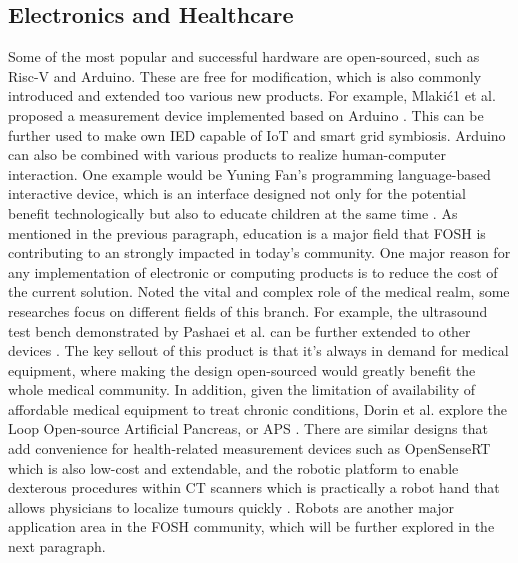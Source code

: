 \documentclass[final-report.tex]{subfiles}
\begin{document}
\subsection{Electronics and Healthcare}
Some of the most popular and successful hardware are open-sourced, such as Risc-V and Arduino. 
These are free for modification, which is also commonly introduced and extended too various new products. 
For example, Mlakić1 et al. proposed a measurement device implemented based on Arduino \cite{mlakic2019open}. This can be further used to make own IED capable of IoT and smart grid symbiosis. Arduino can also be combined with various products to realize human-computer interaction. 
One example would be Yuning Fan's programming language-based interactive device, which is an interface designed not only for the potential benefit technologically but also to educate children at the same time \cite{fan2021open}.
As mentioned in the previous paragraph, education is a major field that FOSH is contributing to an strongly impacted in today's community.  
One major reason for any implementation of electronic or computing products is to reduce the cost of the current solution. Noted the vital and complex role of the medical realm, some researches  focus on different fields of this branch. 
For example, the ultrasound test bench demonstrated by Pashaei et al. can be further extended to other devices \cite{pashaei2018live}. 
The key sellout of this product is that it's always in demand for medical equipment, where making the design open-sourced would greatly benefit the whole medical community. 
In addition, given the limitation of availability of affordable medical equipment to treat chronic conditions, Dorin et al. explore the Loop Open-source Artificial Pancreas, or APS \cite{}.
There are similar designs that add convenience for health-related measurement devices such as OpenSenseRT which is also low-cost and extendable, and the robotic platform to enable dexterous procedures within CT scanners which is practically a robot hand that allows physicians to localize tumours quickly \cite{slade2021open}. Robots are another major application area in the FOSH community, which will be further explored in the next paragraph. 
\end{document}

